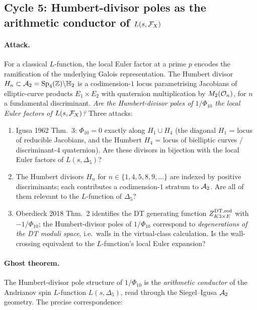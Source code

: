 \subsection*{Cycle 5: Humbert-divisor poles as the arithmetic
conductor of $L(s,\mathcal{F}_X)$}
\label{sec:w14a14-cycle-5}

\paragraph{Attack.}
For a classical $L$-function, the local Euler factor at a prime
$p$ encodes the ramification of the underlying Galois
representation. The Humbert divisor
$H_n\subset\mathcal{A}_2=\mathrm{Sp}_4(\mathbb{Z})\backslash\mathbb{H}_2$ is a codimension-$1$
locus parametrising Jacobians of elliptic-curve products
$E_1\times E_2$ with quaternion multiplication by $M_2(\mathcal{O}_n)$,
for $n$ a fundamental discriminant. \emph{Are the Humbert-divisor
poles of $1/\Phi_{10}$ the local Euler factors of $L(s,\mathcal{F}_X)$?}
Three attacks:

\begin{enumerate}[label=\textbf{O.\arabic*},leftmargin=1.5em]
\item Igusa 1962 Thm.\ 3: $\Phi_{10}=0$ exactly along $H_1\cup H_4$
  (the diagonal $H_1$ = locus of reducible Jacobians, and the
  Humbert $H_4$ = locus of bielliptic curves / discriminant-$4$
  quaternion). Are these divisors in bijection with the local
  Euler factors of $L(s,\Delta_5)$?
\item The Humbert divisors $H_n$ for $n\in\{1,4,5,8,9,\ldots\}$
  are indexed by positive discriminants; each contributes a
  codimension-$1$ stratum to $\mathcal{A}_2$. Are all of them relevant to
  the $L$-function of $\Delta_5$?
\item Oberdieck 2018 Thm.\ 2 identifies the DT generating
  function $Z^{\mathrm{DT},\mathrm{red}}_{K3\times E}$ with $-1/\Phi_{10}$; the
  Humbert-divisor poles of $1/\Phi_{10}$ correspond to
  \emph{degenerations of the DT moduli space}, i.e.\ walls in the
  virtual-class calculation. Is the wall-crossing equivalent to
  the $L$-function's local Euler expansion?
\end{enumerate}

\paragraph{Ghost theorem.}
The Humbert-divisor pole structure of $1/\Phi_{10}$ is the
\emph{arithmetic conductor} of the Andrianov spin $L$-function
$L(s,\Delta_5)$, read through the Siegel--Igusa
$\mathcal{A}_2$ geometry. The precise correspondence:

